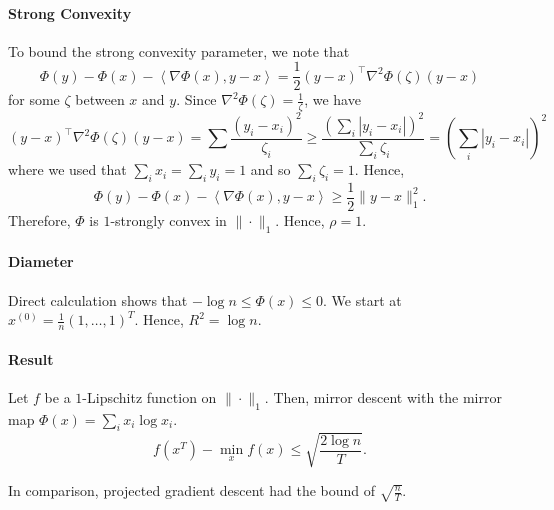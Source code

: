 \paragraph{Strong Convexity}

To bound the strong convexity parameter, we note that
\[
\Phi(y)-\Phi(x)-\left\langle \nabla\Phi(x),y-x\right\rangle =\frac{1}{2}(y-x)^{\top}\nabla^{2}\Phi(\zeta)(y-x)
\]
for some $\zeta$ between $x$ and $y$. Since $\nabla^{2}\Phi(\zeta)=\frac{1}{\zeta}$,
we have
\[
(y-x)^{\top}\nabla^{2}\Phi(\zeta)(y-x)=\sum\frac{(y_{i}-x_{i})^{2}}{\zeta_{i}}\geq\frac{(\sum_{i}|y_{i}-x_{i}|)^{2}}{\sum_{i}\zeta_{i}}=(\sum_{i}|y_{i}-x_{i}|)^{2}
\]
where we used that $\sum_{i}x_{i}=\sum_{i}y_{i}=1$ and so $\sum_{i}\zeta_{i}=1$.
Hence, 
\[
\Phi(y)-\Phi(x)-\left\langle \nabla\Phi(x),y-x\right\rangle \geq\frac{1}{2}\|y-x\|_{1}^{2}.
\]
Therefore, $\Phi$ is $1$-strongly convex in $\|\cdot\|_{1}$. Hence,
$\rho=1$.

\paragraph{Diameter}

Direct calculation shows that $-\log n\leq\Phi(x)\leq0$. We start
at $x^{(0)}=\frac{1}{n}(1,\ldots,1)^{T}$. Hence, $R^{2}=\log n$.

\paragraph{Result}
\begin{thm}
Let $f$ be a $1$-Lipschitz function on $\|\cdot\|_{1}$. Then, mirror
descent with the mirror map $\Phi(x)=\sum_{i}x_{i}\log x_{i}$.
\[
f(x^{T})-\min_{x}f(x)\leq\sqrt{\frac{2\log n}{T}}.
\]
\end{thm}

In comparison, projected gradient descent had the bound of $\sqrt{\frac{n}{T}}$.


